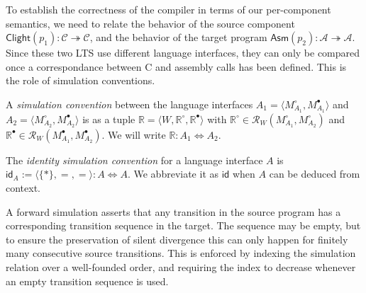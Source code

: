 \documentclass[sigplan,10pt,review,anonymous]{acmart}\settopmatter{printfolios=true,printccs=false,printacmref=false}
\newcommand{\kw}[1]{\ensuremath{ \mathsf{#1} }}
\newcommand{\que}{\circ}
\newcommand{\ans}{\bullet}
\begin{document}
To establish the correctness of the compiler
in terms of our per-component semantics,
we need to relate the behavior of the source component
$\kw{Clight}(p_1) : \mathcal{C} \twoheadrightarrow \mathcal{C}$,
and the behavior of the target program
$\kw{Asm}(p_2) : \mathcal{A} \twoheadrightarrow \mathcal{A}$.
Since these two LTS
use different language interfaces,
they can only be compared once a correspondance between
C and assembly calls has been defined.
This is the role of simulation conventions.

\begin{definition} %
A \emph{simulation convention} between the language interfaces
$A_1 = \langle M_{A_1}^\que, M_{A_1}^\ans \rangle$ and
$A_2 = \langle M_{A_2}^\que, M_{A_2}^\ans \rangle$
is as a tuple $\mathbb{R} = \langle W, \mathbb{R}^\que, \mathbb{R}^\ans \rangle$
with $\mathbb{R}^\que \in \mathcal{R}_W(M_{A_1}^\que, M_{A_2}^\que)$
and $\mathbb{R}^\ans \in \mathcal{R}_W(M_{A_1}^\ans, M_{A_2}^\ans)$.
We will write $\mathbb{R} : A_1 \Leftrightarrow A_2$.
\end{definition}

\begin{definition} %
The \emph{identity simulation convention} for
a language interface $A$ is
$\kw{id}_A := \langle \{*\}, {=}, {=} \rangle : A \Leftrightarrow A$.
We abbreviate it as $\kw{id}$ when $A$ can be deduced
from context.
\end{definition}


A forward simulation asserts that any transition in the source program
has a corresponding transition sequence in the target.
The sequence may be empty,
but to ensure the preservation of silent divergence
this can only happen for finitely many consecutive source transitions.
This is enforced by indexing the simulation relation
over a well-founded order,
and requiring the index to decrease
whenever an empty transition sequence is used.
\end{document}
